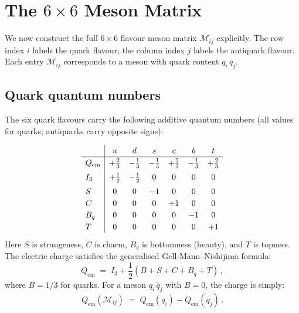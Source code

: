 \documentclass[11pt,a4paper]{article}
\begin{document}
\section{The $6 \times 6$ Meson Matrix}
\label{sec:6x6-matrix}

We now construct the full $6 \times 6$ flavour meson matrix
$\mathcal{M}_{ij}$ explicitly.  The row index $i$ labels the quark
flavour; the column index $j$ labels the antiquark flavour.  Each entry
$\mathcal{M}_{ij}$ corresponds to a meson with quark content
$q_i\,\bar{q}_j$.

\subsection{Quark quantum numbers}

The six quark flavours carry the following additive quantum numbers
(all values for quarks; antiquarks carry opposite signs):

\begin{equation}\label{eq:quark-qn}
\renewcommand{\arraystretch}{1.2}
\begin{array}{l|cccccc}
  & u & d & s & c & b & t \\
\hline
Q_{\text{em}} & +\tfrac{2}{3} & -\tfrac{1}{3} & -\tfrac{1}{3} & +\tfrac{2}{3} & -\tfrac{1}{3} & +\tfrac{2}{3} \\[3pt]
I_3 & +\tfrac{1}{2} & -\tfrac{1}{2} & 0 & 0 & 0 & 0 \\[3pt]
S & 0 & 0 & -1 & 0 & 0 & 0 \\
C & 0 & 0 & 0 & +1 & 0 & 0 \\
B_q & 0 & 0 & 0 & 0 & -1 & 0 \\
T & 0 & 0 & 0 & 0 & 0 & +1 \\
\end{array}
\end{equation}
Here $S$ is strangeness, $C$ is charm, $B_q$ is bottomness (beauty),
and $T$ is topness.  The electric charge satisfies the generalised
Gell-Mann--Nishijima formula:
\begin{equation}\label{eq:GMN}
  Q_{\text{em}} \;=\; I_3 + \frac{1}{2}(B + S + C + B_q + T)\,,
\end{equation}
where $B = 1/3$ for quarks.  For a meson $q_i\,\bar{q}_j$ with
$B = 0$, the charge is simply:
\begin{equation}\label{eq:meson-charge}
  Q_{\text{em}}(\mathcal{M}_{ij})
  \;=\; Q_{\text{em}}(q_i) - Q_{\text{em}}(q_j)\,.
\end{equation}
\end{document}
